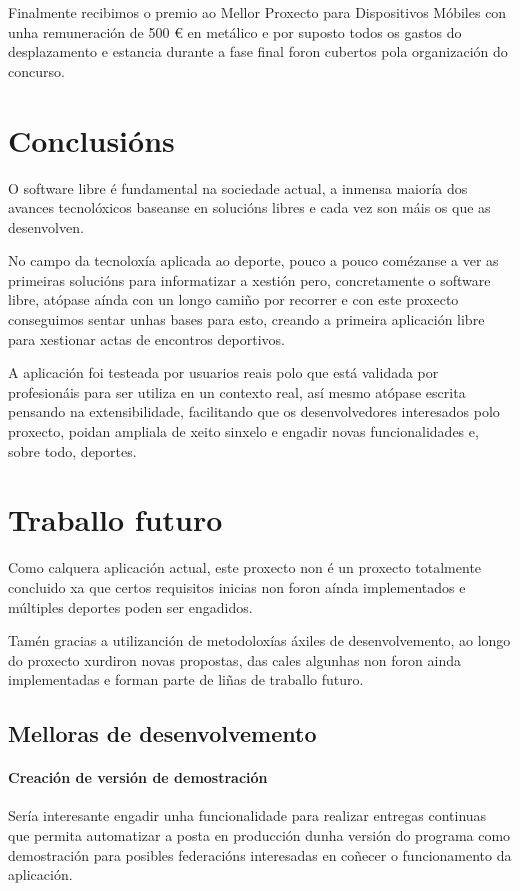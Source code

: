   Finalmente recibimos o premio ao Mellor Proxecto para Dispositivos Móbiles 
con unha remuneración de 500 \euro{} en metálico e por suposto todos os gastos 
do desplazamento e estancia durante a fase final foron cubertos pola 
organización do concurso.

\section{Conclusións}
O software libre é fundamental na sociedade actual, a inmensa maioría dos 
avances tecnolóxicos baseanse en solucións libres e cada vez son máis os que  
as desenvolven.

  No campo da tecnoloxía aplicada ao deporte, pouco a pouco comézanse a ver as 
primeiras solucións para informatizar a xestión pero, concretamente o 
software libre, atópase aínda con un longo camiño por recorrer e con este 
proxecto conseguimos sentar unhas bases para esto, creando a primeira 
aplicación libre para xestionar actas de encontros deportivos.

  A aplicación foi testeada por usuarios reais polo que está validada 
por profesionáis para ser utiliza en un contexto real, así mesmo atópase 
escrita pensando na extensibilidade, facilitando que os desenvolvedores 
interesados polo proxecto, poidan ampliala de xeito sinxelo e engadir novas 
funcionalidades e, sobre todo, deportes.


\section{Traballo futuro}
Como calquera aplicación actual, este proxecto non é un proxecto totalmente 
concluido xa que certos requisitos inicias non foron aínda implementados e 
múltiples deportes poden ser engadidos.

Tamén gracias a utilizanción de metodoloxías áxiles de desenvolvemento, ao 
longo do proxecto xurdiron novas propostas, das cales algunhas non foron 
ainda implementadas e forman parte de liñas de traballo futuro.

  \subsection{Melloras de desenvolvemento}

    \paragraph{Creación de versión de demostración} Sería interesante engadir 
unha funcionalidade para realizar entregas continuas que permita automatizar a 
posta en producción dunha versión do programa como demostración para posibles 
federacións interesadas en coñecer o funcionamento da aplicación.


